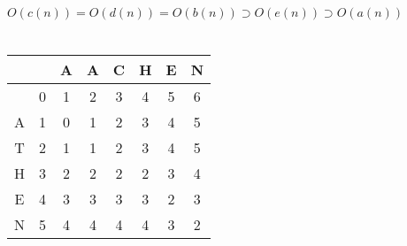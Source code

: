 \documentclass[12pt, a4paper]{article}
\begin{document}
\section{} %

$O(c(n)) = O(d(n)) = O(b(n)) \supset O(e(n)) \supset O(a(n))$

\section{} %

\begin{tabular}{|c|c|c|c|c|c|c|c|}
	\hline
	& & A & A & C & H & E & N\\\hline
	  & 0 & 1 & 2 & 3 & 4 & 5 & 6\\\hline
	A & 1 & 0 & 1 & 2 & 3 & 4 & 5\\\hline
	T & 2 & 1 & 1 & 2 & 3 & 4 & 5\\\hline
	H & 3 & 2 & 2 & 2 & 2 & 3 & 4\\\hline
	E & 4 & 3 & 3 & 3 & 3 & 2 & 3\\\hline
	N & 5 & 4 & 4 & 4 & 4 & 3 & 2\\\hline
\end{tabular}
\end{document}
